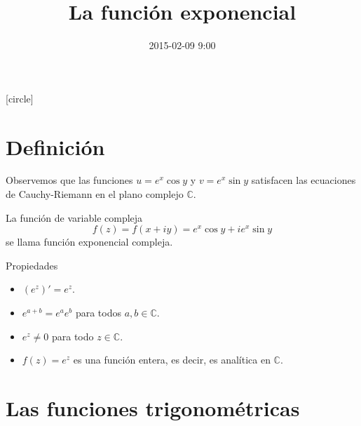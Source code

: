\documentclass[spanish,presentation]{beamer}
\date{2015-02-09 9:00}
\title{La función exponencial}
\begin{document}
\maketitle
{}
[circle]

\tableofcontents

\section{Definición}
\label{sec-1}

\begin{frame}[label=sec-1-1]{}
\begin{block}{}
Observemos que las funciones \(u=e^{x}\cos y\) y \(v=e^{x}\sin y\)
satisfacen las ecuaciones de Cauchy-Riemann en el plano complejo
\(\mathbb{C}\). 
\end{block}

\begin{definition}
La función de variable compleja
\begin{displaymath}
f(z)=f(x+iy)=e^{x}\cos y+ie^{x}\sin y
\end{displaymath}
se llama \alert{función exponencial compleja}.
\end{definition}
\end{frame}

\begin{frame}[label=sec-1-2]{Propiedades}
\begin{itemize}
\item \((e^{z})'=e^{z}\).
\item \(e^{a+b}=e^{a}e^{b}\) para todos \(a,b\in \mathbb{C}\).
\item \(e^{z}\ne 0\) para todo \(z\in \mathbb{C}\).
\item \(f(z)=e^{z}\) es una función \alert{entera}, es decir, es analítica en
\(\mathbb{C}\).
\end{itemize}
\end{frame}

\section{Las funciones trigonométricas}
\label{sec-2}
\end{document}
